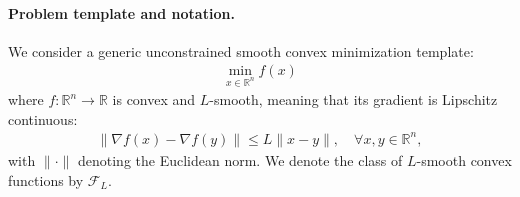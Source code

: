 \documentclass{article}
\theoremstyle{plain}
\theoremstyle{definition}
\theoremstyle{remark}
\begin{document}


\paragraph{Problem template and notation.} %
We consider a generic unconstrained smooth convex minimization template:
\begin{align}\label{problem}
    \min_{x\in \mathbb{R}^n} f(x)
\end{align}
where $f:\mathbb{R}^n\rightarrow \mathbb{R}$ is convex and $L$-smooth, meaning that its gradient is Lipschitz continuous:
\begin{align}\label{cvx-smthness}
\|\nabla f(x)-\nabla f(y)\|\leq L \|x-y\|, \quad \forall x, y \in \mathbb{R}^n,
\end{align}
with $\|\cdot\|$ denoting the Euclidean norm. We denote the class of \(L\)-smooth convex functions by \(\mathcal{F}_L\). 
\end{document}
